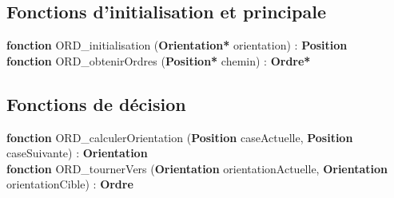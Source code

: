 \documentclass[a4paper, 11pt]{article}
\begin{document}
\subsection*{Fonctions d'initialisation et principale}

\noindent\textbf{fonction} ORD\_initialisation (\textbf{Orientation*} orientation) : \textbf{Position}\\
\noindent\textbf{fonction} ORD\_obtenirOrdres (\textbf{Position*} chemin) : \textbf{Ordre*}\

\subsection*{Fonctions de décision}
\noindent\textbf{fonction} ORD\_calculerOrientation (\textbf{Position} caseActuelle, \textbf{Position} caseSuivante) : \textbf{Orientation}\\
\noindent\textbf{fonction} ORD\_tournerVers (\textbf{Orientation} orientationActuelle, \textbf{Orientation} orientationCible) : \textbf{Ordre}\\
\end{document}
